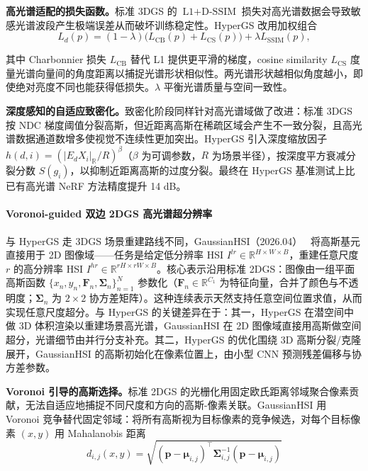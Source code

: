 \textbf{高光谱适配的损失函数。}标准 3DGS 的 $\text{L1} + \text{D-SSIM}$ 损失对高光谱数据会导致敏感光谱波段产生极端误差从而破坏训练稳定性。HyperGS 改用加权组合
\begin{equation}
L_d(p) = (1-\lambda)\bigl(L_{\text{CB}}(p) + L_{\text{CS}}(p)\bigr) + \lambda L_{\text{SSIM}}(p),
\end{equation}

其中 Charbonnier 损失 $L_{\text{CB}}$ 替代 L1 提供更平滑的梯度，cosine similarity $L_{\text{CS}}$ 度量光谱向量间的角度距离以捕捉光谱形状相似性。两光谱形状越相似角度越小，即使绝对亮度不同也能获得低损失。$\lambda$ 平衡光谱质量与空间一致性。

\textbf{深度感知的自适应致密化。}致密化阶段同样针对高光谱域做了改进：标准 3DGS 按 NDC 梯度阈值分裂高斯，但近距离高斯在稀疏区域会产生不一致分裂，且高光谱数据通道数增多使视觉不连续性更加突出。HyperGS 引入深度缩放因子 $h(d,i) = (|E_d X_i|_\mathbb{R} / R)^\beta$（$\beta$ 为可调参数，$R$ 为场景半径），按深度平方衰减分裂分数 $S(g_i)$，以抑制近距离高斯的过度分裂。最终在 HyperGS 基准测试上比已有高光谱 NeRF 方法精度提升 14 dB。

\paragraph{Voronoi-guided 双边 2DGS 高光谱超分辨率}

与 HyperGS 走 3DGS 场景重建路线不同，GaussianHSI（2026.04）~\cite{2604_17727} 将高斯基元直接用于 2D 图像域——任务是给定低分辨率 HSI $I^{lr}\in\mathbb{R}^{H\times W\times B}$，重建任意尺度 $r$ 的高分辨率 HSI $I^{hr}\in\mathbb{R}^{rH\times rW\times B}$。核心表示沿用标准 2DGS：图像由一组平面高斯函数 $\{x_n, y_n, \mathbf{F}_n, \boldsymbol{\Sigma}_n\}_{n=1}^N$ 参数化（$\mathbf{F}_n\in\mathbb{R}^{C_1}$ 为特征向量，合并了颜色与不透明度；$\boldsymbol{\Sigma}_n$ 为 $2\times2$ 协方差矩阵）。这种连续表示天然支持任意空间位置求值，从而实现任意尺度超分。与 HyperGS 的关键差异在于：其一，HyperGS 在潜空间中做 3D 体积渲染以重建场景高光谱，GaussianHSI 在 2D 图像域直接用高斯做空间超分，光谱细节由并行分支补充。其二，HyperGS 的优化围绕 3D 高斯分裂/克隆展开，GaussianHSI 的高斯初始化在像素位置上，由小型 CNN 预测残差偏移与协方差参数。

\textbf{Voronoi 引导的高斯选择。}标准 2DGS 的光栅化用固定欧氏距离邻域聚合像素贡献，无法自适应地捕捉不同尺度和方向的高斯-像素关联。GaussianHSI 用 Voronoi 竞争替代固定邻域：将所有高斯视为目标像素的竞争候选，对每个目标像素 $(x,y)$ 用 Mahalanobis 距离
\begin{equation}
d_{i,j}(x,y) = \sqrt{(\mathbf{p} - \boldsymbol{\mu}_{i,j})^\top \boldsymbol{\Sigma}_{i,j}^{-1}(\mathbf{p} - \boldsymbol{\mu}_{i,j})}
\end{equation}

